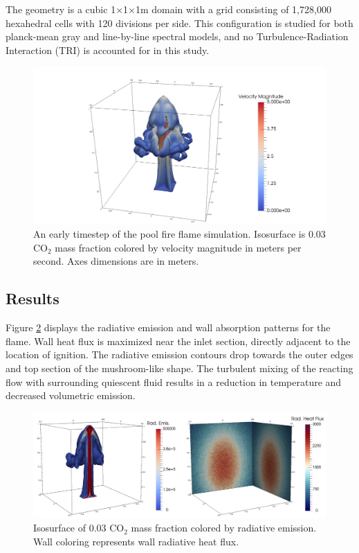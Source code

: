 The geometry is a cubic 1$\times$1$\times$1m domain with a grid consisting of 1,728,000 hexahedral cells with 120 divisions per side.
This configuration is studied for both planck-mean gray and line-by-line spectral models, and no Turbulence-Radiation Interaction (TRI) is accounted for in this study. %

\begin{figure}
\includegraphics[width=\linewidth]{figures/ch4/contour_early.png}
\caption{An early timestep of the pool fire flame simulation. Isosurface is 0.03 CO$_2$ mass fraction colored by velocity magnitude in meters per second. Axes dimensions are in meters.}
\label{fig:PoolFire_diagram}
\end{figure}

\subsection{Results}
Figure \ref{fig:PoolFire_radiationcontours} displays the radiative emission and wall absorption patterns for the flame. Wall heat flux is maximized near the inlet section, directly adjacent to the location of ignition. 
The radiative emission contours drop towards the outer edges and top section of the mushroom-like shape. The turbulent mixing of the reacting flow with surrounding quiescent fluid results in a reduction in temperature and decreased volumetric emission.  

\begin{figure}
\includegraphics[width=\linewidth]{figures/ch4/radiation_contours.png}
\caption{Isosurface of 0.03 CO$_2$ mass fraction colored by radiative emission. Wall coloring represents wall radiative heat flux.}
\label{fig:PoolFire_radiationcontours}
\end{figure}


